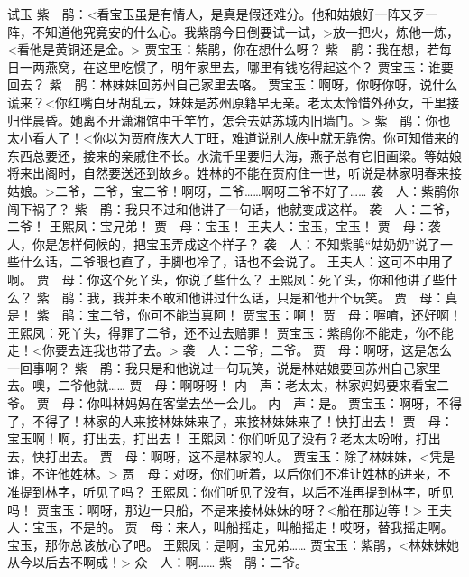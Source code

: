 \documentclass{article}
\begin{document}
试玉
紫　鹃：<看宝玉虽是有情人，是真是假还难分。他和姑娘好一阵又歹一阵，不知道他究竟安的什么心。我紫鹃今日倒要试一试，>放一把火，炼他一炼，<看他是黄铜还是金。>
贾宝玉：紫鹃，你在想什么呀？
紫　鹃：我在想，若每日一两燕窝，在这里吃惯了，明年家里去，哪里有钱吃得起这个？
贾宝玉：谁要回去？
紫　鹃：林妹妹回苏州自己家里去咯。
贾宝玉：啊呀，你呀你呀，说什么谎来？<你红嘴白牙胡乱云，妹妹是苏州原籍早无亲。老太太怜惜外孙女，千里接归伴晨昏。她离不开潇湘馆中千竿竹，怎会去姑苏城内旧墙门。>
紫　鹃：你也太小看人了！<你以为贾府族大人丁旺，难道说别人族中就无靠傍。你可知借来的东西总要还，接来的亲戚住不长。水流千里要归大海，燕子总有它旧画梁。等姑娘将来出阁时，自然要送还到故乡。姓林的不能在贾府住一世，听说是林家明春来接姑娘。>二爷，二爷，宝二爷！啊呀，二爷……啊呀二爷不好了……
袭　人：紫鹃你闯下祸了？
紫　鹃：我只不过和他讲了一句话，他就变成这样。
袭　人：二爷，二爷！
王熙凤：宝兄弟！
贾　母：宝玉！
王夫人：宝玉，宝玉！
贾　母：袭人，你是怎样伺候的，把宝玉弄成这个样子？
袭　人：不知紫鹃“姑奶奶”说了一些什么话，二爷眼也直了，手脚也冷了，话也不会说了。
王夫人：这可不中用了啊。
贾　母：你这个死丫头，你说了些什么？
王熙凤：死丫头，你和他讲了些什么？
紫　鹃：我，我并未不敢和他讲过什么话，只是和他开个玩笑。
贾　母：真是！
紫　鹃：宝二爷，你可不能当真阿！
贾宝玉：啊！
贾　母：喔唷，还好啊！
王熙凤：死丫头，得罪了二爷，还不过去赔罪！
贾宝玉：紫鹃你不能走，你不能走！<你要去连我也带了去。>
袭　人：二爷，二爷。
贾　母：啊呀，这是怎么一回事啊？
紫　鹃：我只是和他说过一句玩笑，说是林姑娘要回苏州自己家里去。噢，二爷他就……
贾　母：啊呀呀！
内　声：老太太，林家妈妈要来看宝二爷。
贾　母：你叫林妈妈在客堂去坐一会儿。
内　声：是。
贾宝玉：啊呀，不得了，不得了！林家的人来接林妹妹来了，来接林妹妹来了！快打出去！
贾　母：宝玉啊！啊，打出去，打出去！
王熙凤：你们听见了没有？老太太吩咐，打出去，快打出去。
贾　母：啊呀，这不是林家的人。
贾宝玉：除了林妹妹，<凭是谁，不许他姓林。>
贾　母：对呀，你们听着，以后你们不准让姓林的进来，不准提到林字，听见了吗？
王熙凤：你们听见了没有，以后不准再提到林字，听见吗！
贾宝玉：啊呀，那边一只船，不是来接林妹妹的呀？<船在那边等！>
王夫人：宝玉，不是的。
贾　母：来人，叫船摇走，叫船摇走！哎呀，替我摇走啊。宝玉，那你总该放心了吧。
王熙凤：是啊，宝兄弟……
贾宝玉：紫鹃，<林妹妹她从今以后去不啊成！>
众　人：啊……
紫　鹃：二爷。
\end{document}
